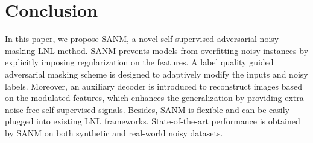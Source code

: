 \documentclass[10pt,twocolumn,letterpaper]{article}
\begin{document}
\vspace{-2mm}
\section{Conclusion}
\vspace{-2mm}
In this paper, we propose SANM, a novel self-supervised adversarial noisy masking LNL method. SANM prevents models from overfitting noisy instances by explicitly imposing regularization on the features. A label quality guided adversarial masking scheme is designed to adaptively modify the inputs and noisy labels. Moreover, an auxiliary decoder is introduced to reconstruct images based on the modulated features, which enhances the generalization by providing extra noise-free self-supervised signals. Besides, SANM is flexible and can be easily plugged into existing LNL frameworks. State-of-the-art performance is obtained by SANM on both synthetic and real-world noisy datasets.   



\medskip


{\small


}
\end{document}
